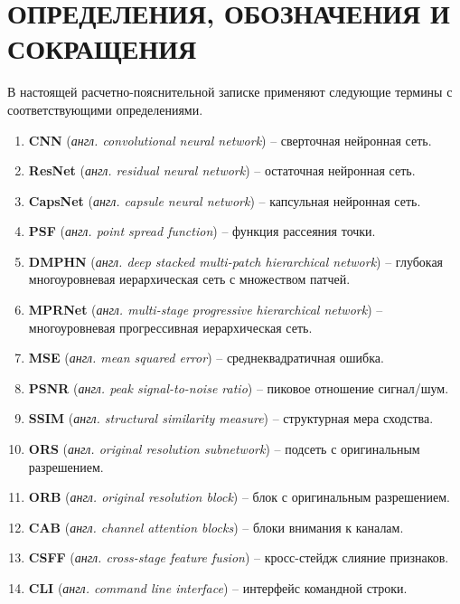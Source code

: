 \part*{ОПРЕДЕЛЕНИЯ, ОБОЗНАЧЕНИЯ И\\СОКРАЩЕНИЯ}
В настоящей расчетно-пояснительной записке применяют следующие термины с соответствующими определениями.

\begin{enumerate}[left=0.49cm]
	\item \textbf{CNN} (\textit{англ. convolutional neural network}) -- сверточная нейронная сеть.
	\item \textbf{ResNet} (\textit{англ. residual neural network}) -- остаточная нейронная сеть.
	\item \textbf{CapsNet} (\textit{англ. capsule neural network}) -- капсульная нейронная сеть.
	\item \textbf{PSF} (\textit{англ. point spread function}) -- функция рассеяния точки.
	\item \textbf{DMPHN} (\textit{англ. deep stacked multi-patch hierarchical network}) -- глубокая многоуровневая иерархическая сеть с множеством патчей.
	\item \textbf{MPRNet} (\textit{англ. multi-stage progressive hierarchical network}) -- многоуровневая прогрессивная иерархическая сеть.
	\item \textbf{MSE} (\textit{англ. mean squared error}) -- среднеквадратичная ошибка.
	\item \textbf{PSNR} (\textit{англ. peak signal-to-noise ratio}) -- пиковое отношение сигнал/шум.
	\item \textbf{SSIM} (\textit{англ. structural similarity measure}) -- структурная мера сходства.
	\item \textbf{ORS} (\textit{англ. original resolution subnetwork}) -- подсеть с оригинальным разрешением.
	\item \textbf{ORB} (\textit{англ. original resolution block}) -- блок с оригинальным разрешением.
	\item \textbf{CAB} (\textit{англ. channel attention blocks}) -- блоки внимания к каналам.
	\item \textbf{CSFF} (\textit{англ. cross-stage feature fusion}) -- кросс-стейдж слияние признаков.
	\item \textbf{CLI} (\textit{англ. command line interface}) -- интерфейс командной строки.
\end{enumerate}
